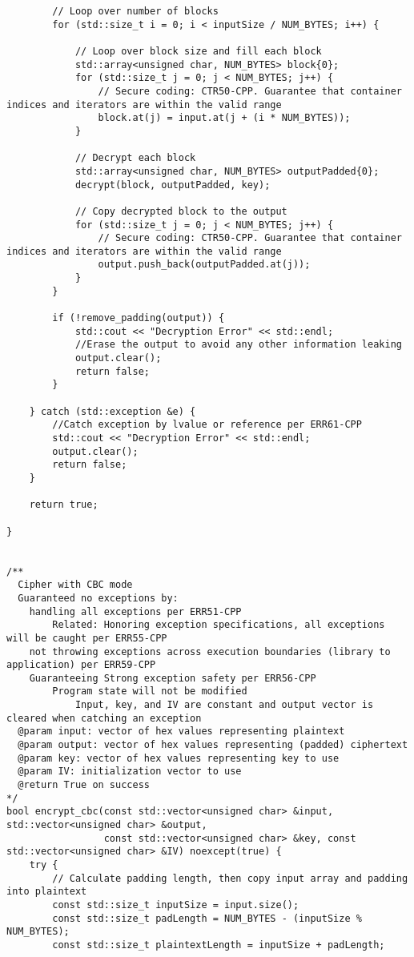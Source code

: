 \documentclass[a4paper,12pt]{article}
\begin{document}
{\begin{lstlisting}
        // Loop over number of blocks
        for (std::size_t i = 0; i < inputSize / NUM_BYTES; i++) {

            // Loop over block size and fill each block
            std::array<unsigned char, NUM_BYTES> block{0};
            for (std::size_t j = 0; j < NUM_BYTES; j++) {
                // Secure coding: CTR50-CPP. Guarantee that container indices and iterators are within the valid range
                block.at(j) = input.at(j + (i * NUM_BYTES));
            }

            // Decrypt each block
            std::array<unsigned char, NUM_BYTES> outputPadded{0};
            decrypt(block, outputPadded, key);

            // Copy decrypted block to the output
            for (std::size_t j = 0; j < NUM_BYTES; j++) {
                // Secure coding: CTR50-CPP. Guarantee that container indices and iterators are within the valid range
                output.push_back(outputPadded.at(j));
            }
        }

        if (!remove_padding(output)) {
            std::cout << "Decryption Error" << std::endl;
            //Erase the output to avoid any other information leaking
            output.clear();
            return false;
        }

    } catch (std::exception &e) {
        //Catch exception by lvalue or reference per ERR61-CPP
        std::cout << "Decryption Error" << std::endl;
        output.clear();
        return false;
    }

    return true;

}


/**
  Cipher with CBC mode
  Guaranteed no exceptions by:
    handling all exceptions per ERR51-CPP
        Related: Honoring exception specifications, all exceptions will be caught per ERR55-CPP
    not throwing exceptions across execution boundaries (library to application) per ERR59-CPP
    Guaranteeing Strong exception safety per ERR56-CPP
        Program state will not be modified
            Input, key, and IV are constant and output vector is cleared when catching an exception
  @param input: vector of hex values representing plaintext
  @param output: vector of hex values representing (padded) ciphertext
  @param key: vector of hex values representing key to use
  @param IV: initialization vector to use
  @return True on success
*/
bool encrypt_cbc(const std::vector<unsigned char> &input, std::vector<unsigned char> &output,
                 const std::vector<unsigned char> &key, const std::vector<unsigned char> &IV) noexcept(true) {
    try {
        // Calculate padding length, then copy input array and padding into plaintext
        const std::size_t inputSize = input.size();
        const std::size_t padLength = NUM_BYTES - (inputSize % NUM_BYTES);
        const std::size_t plaintextLength = inputSize + padLength;


\end{lstlisting}}
\end{document}
